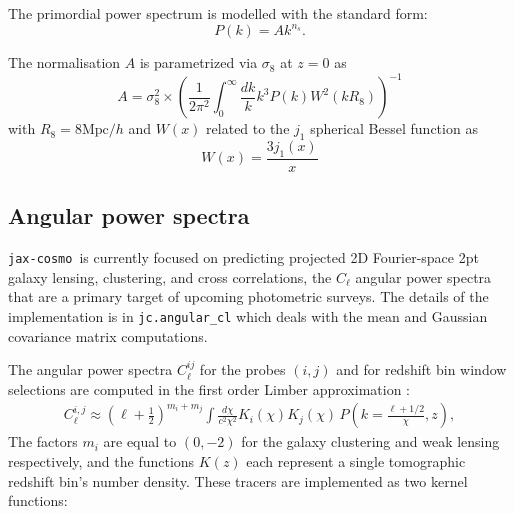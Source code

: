 \documentclass[twocolumn,twocolappendix,nofootinbib,iop]{openjournal}
\newcommand{\JZ}[1]{{\color{purple}JZ: #1}}
\newcommand{\jaxcosmo}{\texttt{jax-cosmo}}
\begin{document}
The primordial power spectrum is modelled with the standard form:
\begin{equation}
    P(k) = A k^{n_s}.
\end{equation}

The normalisation $A$ is parametrized via $\sigma_8$ at $z=0$ as 
\begin{equation}
    A = \sigma_8^2 \times \left(\frac{1}{2 \pi^2} \int_0^\infty \frac{dk}{k} k^3 P(k) W^2(kR_8) \right)^{-1}
\end{equation}
with $R_8 = 8 \mathrm{Mpc}/h$ and $W(x)$ related to the $j_1$ spherical Bessel function as
\begin{equation}
    W(x) = \frac{3j_1(x)}{x}
\end{equation}

%
\subsection{Angular power spectra}
%
\jaxcosmo\ is currently focused on predicting projected 2D Fourier-space 2pt galaxy lensing, clustering, and cross correlations, the $C_\ell$ angular power spectra that are a primary target of upcoming photometric surveys. The details of the implementation is in \texttt{jc.angular\_cl} which deals with the mean and Gaussian covariance matrix computations.

The angular power spectra $C_\ell^{ij}$ for the probes $(i,j)$ and for redshift bin window selections are computed in the first order Limber approximation \citep{PhysRevD.78.123506}:
\begin{align}
    C_\ell^{i,j} \approx \left(\ell+\frac{1}{2}\right)^{m_i+m_j}\int\frac{d\chi}{c^2\chi^2}K_i(\chi)K_j(\chi)\,P\left(k=\frac{\ell+1/2}{\chi},z\right),\label{eq:Cell_limber}
\end{align}
The factors $m_i$ are equal to $(0,-2)$ for the galaxy clustering and weak lensing respectively, and the functions $K(z)$ each represent a single tomographic redshift bin's number density. These tracers are implemented as two kernel functions:
\end{document}
